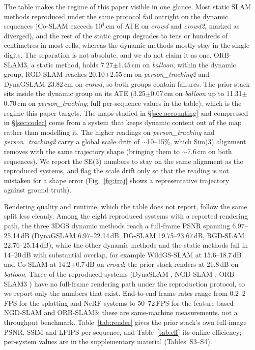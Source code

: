 \documentclass[10pt,twocolumn,letterpaper]{article}
\newcommand{\gate}[1]{{#1}} %
\begin{document}


The table makes the regime of this paper visible in one glance. Most static SLAM methods
reproduced under the same protocol fail outright on the dynamic sequences (Co-SLAM
\cite{CoSLAM} exceeds $10^4$\,cm of ATE on \emph{crowd} and \emph{crowd2}, marked as
diverged), and the rest of the static group degrades to tens or hundreds of centimetres
in most cells, whereas the dynamic methods mostly
stay in the single digits. The separation is not absolute, and we do not claim it as one.
ORB-SLAM3, a static method, holds \gate{7.27}$\pm$\gate{1.45}\,cm on \emph{balloon};
within the dynamic group,
RGD-SLAM reaches \gate{20.10}$\pm$\gate{2.55}\,cm on \emph{person\_tracking2} and
DynaGSLAM \gate{23.82}\,cm on \emph{crowd}, so both groups contain failures. %
The prior
stack sits inside the dynamic group on its ATE
(\gate{3.25}$\pm$\gate{0.07}\,cm on \emph{balloon} up to \gate{11.31}$\pm$\gate{0.70}\,cm on
\emph{person\_tracking}; full per-sequence values in the table), %
which is the regime this paper targets. The maps studied in \S\ref{sec:accounting} and compressed in
\S\ref{sec:codec} come from a system that keeps dynamic content out of the map rather than
modelling it. The higher readings on \emph{person\_tracking} and
\emph{person\_tracking2} carry a global scale drift of \gate{$\sim$10--15\%},
which Sim(3) alignment removes with the same trajectory shape (bringing them to
\gate{$\sim$7.6}\,cm on both sequences). %
We report the SE(3) numbers to stay on the same alignment as the reproduced systems, and
flag the scale drift only so that the reading is not mistaken for a shape error
(Fig.~\ref{fig:traj} shows a representative trajectory against ground truth).

Rendering quality and runtime, which the table does not report, follow the same split less cleanly.
Among the eight reproduced systems with a reported rendering
path, the three 3DGS dynamic methods reach a full-frame PSNR spanning \gate{6.97--25.14}\,dB
(DynaGSLAM \gate{6.97--22.14}\,dB, DG-SLAM \gate{19.75--23.67}\,dB, RGD-SLAM \gate{22.76--25.14}\,dB), while the other dynamic methods and the static methods fall in
\gate{14--20}\,dB with substantial overlap, for example WildGS-SLAM at \gate{15.6--18.7}\,dB and
Co-SLAM at \gate{14.2}$\pm$\gate{0.7}\,dB on \emph{crowd}; the prior stack renders at
\gate{21.8}\,dB on \emph{balloon}. %
Three of the reproduced systems (DynaSLAM
\cite{DynaSLAM}, NGD-SLAM \cite{NGDSLAM}, ORB-SLAM3 \cite{ORBSLAM3}) have no full-frame
rendering path under the reproduction protocol, so we report only the numbers that exist.
End-to-end frame rates range from \gate{0.2--2}\,FPS for the splatting and NeRF systems to
\gate{50--72}\,FPS for the feature-based NGD-SLAM and ORB-SLAM3; these are same-machine
measurements, not a throughput benchmark. %
Table~\ref{tab:render} gives the prior stack's own full-image PSNR, SSIM and LPIPS per
sequence, and Table~\ref{tab:eff} its online efficiency; per-system values are in the
supplementary material (Tables~S3--S4).
\end{document}
